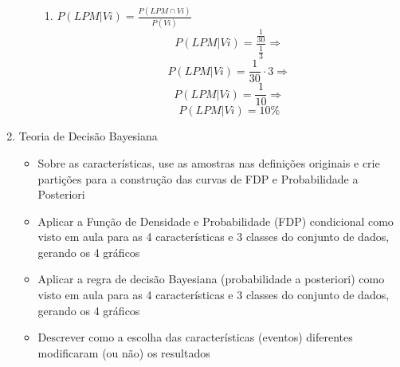 \documentclass[a4paper, 12pt]{article}
\begin{document}
\begin{enumerate}
\begin{itemize}
\begin{enumerate}
  \item $P(LPM|Vi)=\frac{P(LPM \cap Vi)}{P(Vi)}$
   $$P(LPM|Vi)=\frac{\frac{1}{30}}{\frac{1}{3}} \Rightarrow$$
   $$P(LPM|Vi)=\frac{1}{30}\cdot3 \Rightarrow$$
   $$P(LPM|Vi)=\frac{1}{10} \Rightarrow$$
   $$P(LPM|Vi)=10\% $$
     
  \end{enumerate}
  

\end{itemize}
\item Teoria de Decisão Bayesiana
  \begin{itemize}
  \item Sobre as características, use as amostras nas definições originais e crie partições para a construção das curvas de FDP e Probabilidade a Posteriori
  \item Aplicar a Função de Densidade e Probabilidade (FDP) condicional como visto em aula para as 4 características e 3 classes do conjunto de dados, gerando os 4 gráficos
  \item Aplicar a regra de decisão Bayesiana (probabilidade a posteriori) como visto em aula para as 4 características e 3 classes do conjunto de dados, gerando os 4 gráficos
  \item Descrever como a escolha das características (eventos) diferentes modificaram (ou não) os resultados
  \end{itemize}

\end{enumerate}
\end{document}

